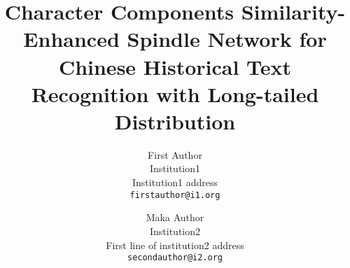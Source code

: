 \documentclass[10pt,twocolumn,letterpaper]{article}
\title{Character Components Similarity-Enhanced Spindle Network for Chinese Historical Text Recognition with Long-tailed Distribution}
\author{First Author\\
Institution1\\
Institution1 address\\
{\tt\small firstauthor@i1.org}
\and
Maka Author\\
Institution2\\
First line of institution2 address\\
{\tt\small secondauthor@i2.org}
}
\begin{document}
\maketitle

    






{
    \small
    
    
}


% 
\end{document}
